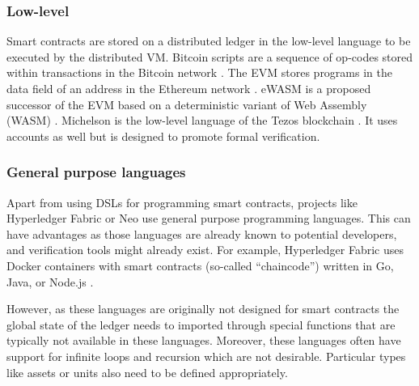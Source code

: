 \subsubsection{Low-level}
Smart contracts are stored on a distributed ledger in the low-level language to be executed by the distributed VM.
Bitcoin scripts are a sequence of op-codes stored within transactions in the Bitcoin network \cite{BitcoinWiki2018Script}. 
The EVM stores programs in the data field of an address in the Ethereum network \cite{Wood2014}. 
eWASM is a proposed successor of the EVM based on a deterministic variant of Web Assembly (WASM) \cite{Wanderer2015,EthereumFoundation2018ewasm}.
Michelson is the low-level language of the Tezos blockchain \cite{DynamicLedgerSolutions2017}. It uses accounts as well but is designed to promote formal verification.

\subsubsection{General purpose languages}
Apart from using DSLs for programming smart contracts, projects like Hyperledger Fabric or Neo use general purpose programming languages.
This can have advantages as those languages are already known to potential developers, and verification tools might already exist.
For example, Hyperledger Fabric uses Docker containers with smart contracts (so-called ``chaincode'') written in Go, Java, or Node.js \cite{Cachin2016}. 

However, as these languages are originally not designed for smart contracts the global state of the ledger needs to imported through special functions that are typically not available in these languages.
Moreover, these languages often have support for infinite loops and recursion which are not desirable.
Particular types like assets or units also need to be defined appropriately. 

